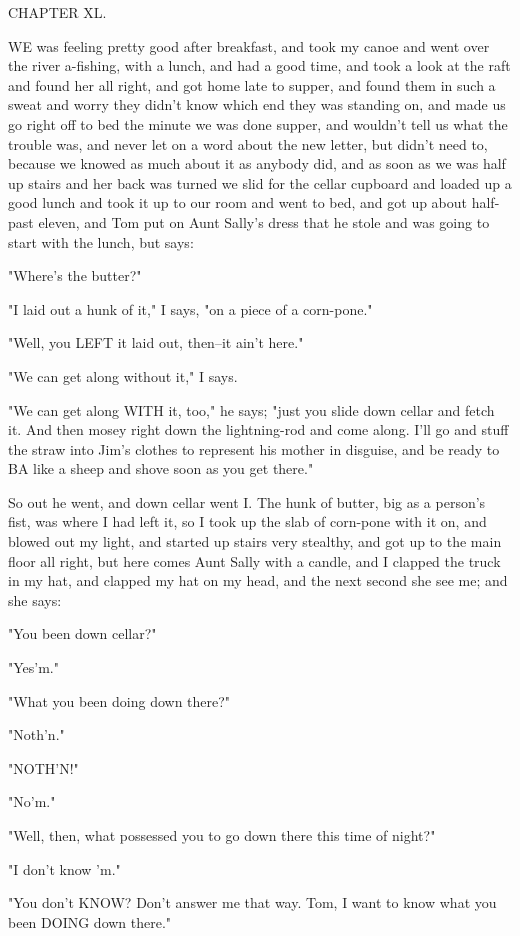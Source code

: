 CHAPTER XL.

WE was feeling pretty good after breakfast, and took my canoe and went
over the river a-fishing, with a lunch, and had a good time, and took a
look at the raft and found her all right, and got home late to supper,
and found them in such a sweat and worry they didn't know which end they
was standing on, and made us go right off to bed the minute we was done
supper, and wouldn't tell us what the trouble was, and never let on a
word about the new letter, but didn't need to, because we knowed as much
about it as anybody did, and as soon as we was half up stairs and her
back was turned we slid for the cellar cupboard and loaded up a good
lunch and took it up to our room and went to bed, and got up about
half-past eleven, and Tom put on Aunt Sally's dress that he stole and
was going to start with the lunch, but says:

"Where's the butter?"

"I laid out a hunk of it," I says, "on a piece of a corn-pone."

"Well, you LEFT it laid out, then--it ain't here."

"We can get along without it," I says.

"We can get along WITH it, too," he says; "just you slide down cellar and
fetch it.  And then mosey right down the lightning-rod and come along.
I'll go and stuff the straw into Jim's clothes to represent his mother in
disguise, and be ready to BA like a sheep and shove soon as you get
there."

So out he went, and down cellar went I. The hunk of butter, big as a
person's fist, was where I had left it, so I took up the slab of
corn-pone with it on, and blowed out my light, and started up stairs very
stealthy, and got up to the main floor all right, but here comes Aunt
Sally with a candle, and I clapped the truck in my hat, and clapped my
hat on my head, and the next second she see me; and she says:

"You been down cellar?"

"Yes'm."

"What you been doing down there?"

"Noth'n."

"NOTH'N!"

"No'm."

"Well, then, what possessed you to go down there this time of night?"

"I don't know 'm."

"You don't KNOW?  Don't answer me that way. Tom, I want to know what you
been DOING down there."

